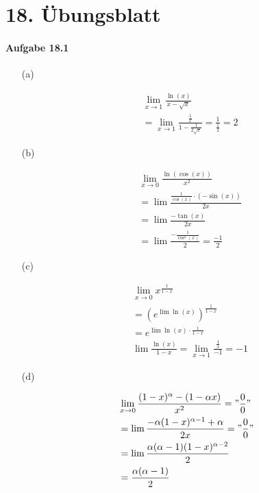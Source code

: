 \section{18. Übungsblatt}

\paragraph{Aufgabe 18.1}

\begin{enumerate}

\item[(a)]

\begin{align*}
&\lim_{x\rightarrow 1}\frac{\ln(x)}{x-\sqrt{x}}\\
&=\lim_{x\rightarrow1}\frac{\frac{1}{x}}{1-\frac{1}{2\sqrt{x}}}=\frac{1}{\frac{1}{2}}=2
\end{align*}

\item[(b)]

\begin{align*}
&\lim_{x\rightarrow0}\frac{\ln(\cos(x))}{x^2}\\
&=\lim\frac{\frac{1}{\cos(x)}\cdot(-\sin(x))}{2x}\\
&=\lim\frac{-\tan(x)}{2x}\\
&=\lim\frac{-\frac{1}{\cos^2(x)}}{2}=\frac{-1}{2}
\end{align*}

\item[(c)]

\begin{align*}
&\lim_{x\rightarrow0}x^{\frac{1}{1-x}}\\
&=(e^{\lim \ln(x)})^{\frac{1}{1-x}}\\
&=e^{\lim\ln(x)\cdot\frac{1}{1-x}}\\
&\lim\frac{\ln(x)}{1-x}=\lim_{x\rightarrow1}\frac{\frac{1}{x}}{-1}=-1
\end{align*}

\item[(d)]

\begin{align*}
&\lim_{x\rightarrow0}\frac{(1-x)^\alpha-(1-\alpha x)}{x^2}="\frac{0}{0}"\\
&=\lim\frac{-\alpha(1-x)^{\alpha-1}+\alpha}{2x}="\frac{0}{0}"\\
&=\lim\frac{\alpha(\alpha-1)(1-x)^{\alpha-2}}{2}\\
&=\frac{\alpha(\alpha-1)}{2}
\end{align*}


\end{enumerate}
